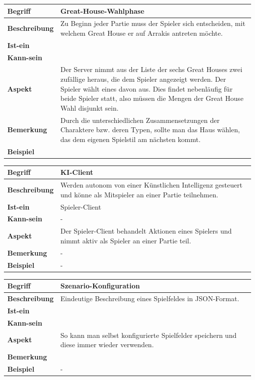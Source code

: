 \documentclass[12pt]{article}
\begin{document}
\begin{tabularx}{16cm}{|l|X|}
\hline
\textbf{Begriff} & \textbf{Great-House-Wahlphase} \\
\hline
\textbf{Beschreibung} & Zu Beginn jeder Partie muss der Spieler sich entscheiden, mit welchem Great House er auf Arrakis antreten möchte. \\
\hline
\textbf{Ist-ein} & \\
\hline
\textbf{Kann-sein} & \\
\hline
\textbf{Aspekt} & Der Server nimmt aus der Liste der sechs Great Houses zwei zufällige heraus, die dem Spieler angezeigt werden. Der Spieler wählt eines davon aus. Dies findet nebenläufig für beide Spieler statt, also müssen die Mengen der Great House Wahl disjunkt sein.\\
\hline
\textbf{Bemerkung} & Durch die unterschiedlichen Zusammensetzungen der Charaktere bzw. deren Typen, sollte man das Haus wählen, das dem eigenen Spielstil am nächsten kommt. \\
\hline
\textbf{Beispiel} &  \\
\hline
\end{tabularx}

\begin{tabularx}{16cm}{|l|X|}
\hline
\textbf{Begriff} & \textbf{KI-Client} \\
\hline
\textbf{Beschreibung} & Werden autonom von einer Künstlichen Intelligenz gesteuert und könne als Mitspieler an einer Partie teilnehmen. \\
\hline
\textbf{Ist-ein} & Spieler-Client \\
\hline
\textbf{Kann-sein} & - \\
\hline
\textbf{Aspekt} & Der Spieler-Client behandelt Aktionen eines Spielers und nimmt aktiv als Spieler an einer Partie teil. \\
\hline
\textbf{Bemerkung} & - \\
\hline
\textbf{Beispiel} & - \\
\hline
\end{tabularx}

\begin{tabularx}{16cm}{|l|X|}
\hline
\textbf{Begriff} & \textbf{Szenario-Konfiguration } \\
\hline
\textbf{Beschreibung} & Eindeutige Beschreibung eines Spielfeldes in JSON-Format. \\
\hline
\textbf{Ist-ein} & \\
\hline
\textbf{Kann-sein} & \\
\hline
\textbf{Aspekt} & So kann man selbst konfigurierte Spielfelder speichern und diese immer wieder verwenden.\\
\hline
\textbf{Bemerkung} &  \\
\hline
\textbf{Beispiel} & - \\
\hline
\end{tabularx}
\end{document}
